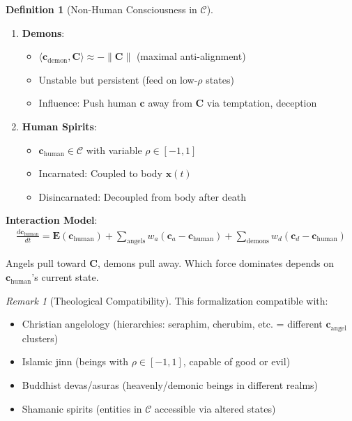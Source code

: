 \documentclass[11pt,a4paper]{article}
\theoremstyle{definition}
\newtheorem{definition}{Definition}[section]
\theoremstyle{remark}
\newtheorem{remark}{Remark}[section]
\newcommand{\CC}{\mathcal{C}}
\newcommand{\EE}{\mathbf{E}}
\newcommand{\cc}{\mathbf{c}}
\begin{document}
\begin{enumerate}
\begin{definition}[Non-Human Consciousness in \(\CC\)]
\begin{enumerate}
    \item \textbf{Demons}:
        \begin{itemize}
            \item \(\langle \cc_{\text{demon}}, \mathbf{C} \rangle \approx -\|\mathbf{C}\|\) (maximal anti-alignment)
            \item Unstable but persistent (feed on low-\(\rho\) states)
            \item Influence: Push human \(\cc\) away from \(\mathbf{C}\) via temptation, deception
        \end{itemize}
    
    \item \textbf{Human Spirits}:
        \begin{itemize}
            \item \(\cc_{\text{human}} \in \CC\) with variable \(\rho \in [-1, 1]\)
            \item Incarnated: Coupled to body \(\mathbf{x}(t)\)
            \item Disincarnated: Decoupled from body after death
        \end{itemize}
\end{enumerate}

\textbf{Interaction Model}:
\begin{align}
\frac{d\cc_{\text{human}}}{dt} = \EE(\cc_{\text{human}}) + \sum_{\text{angels}} w_a(\cc_a - \cc_{\text{human}}) + \sum_{\text{demons}} w_d(\cc_d - \cc_{\text{human}})
\end{align}

Angels pull toward \(\mathbf{C}\), demons pull away. Which force dominates depends on \(\cc_{\text{human}}\)'s current state.
\end{definition}

\begin{remark}[Theological Compatibility]
This formalization compatible with:
\begin{itemize}
    \item Christian angelology (hierarchies: seraphim, cherubim, etc. = different \(\cc_{\text{angel}}\) clusters)
    \item Islamic jinn (beings with \(\rho \in [-1, 1]\), capable of good or evil)
    \item Buddhist devas/asuras (heavenly/demonic beings in different realms)
    \item Shamanic spirits (entities in \(\CC\) accessible via altered states)
\end{itemize}


\end{remark}
\end{enumerate}
\end{document}
